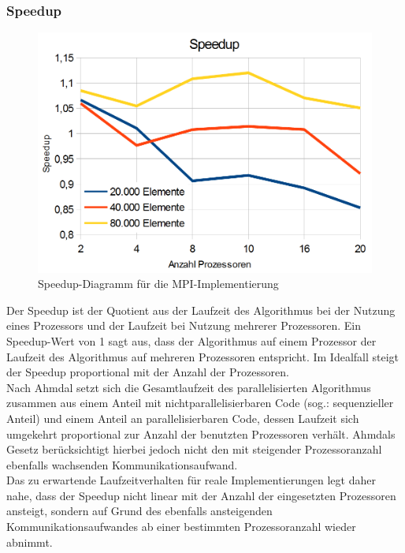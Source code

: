 \documentclass[a4paper,12pt]{scrartcl}
\begin{document}
\subsubsection{Speedup}
\begin{figure}[htb]
  \begin{center}
    \includegraphics[width=1\hsize]{../speedup.png}
  \end{center}
  \caption{\label{mpispeedup}
    Speedup-Diagramm f\"ur die MPI-Implementierung}
\end{figure}
Der Speedup ist der Quotient aus der Laufzeit des Algorithmus bei der Nutzung eines Prozessors und der Laufzeit bei Nutzung mehrerer Prozessoren.
Ein Speedup-Wert von 1 sagt aus, dass der Algorithmus auf einem Prozessor der Laufzeit des Algorithmus auf mehreren Prozessoren entspricht.
Im Idealfall steigt der Speedup proportional mit der Anzahl der Prozessoren. \\

Nach Ahmdal setzt sich die Gesamtlaufzeit des parallelisierten Algorithmus zusammen aus einem Anteil mit nichtparallelisierbaren Code (sog.: sequenzieller
Anteil) und einem Anteil an parallelisierbaren Code, dessen Laufzeit sich umgekehrt proportional zur Anzahl der benutzten Prozessoren verhält.
Ahmdals Gesetz berücksichtigt hierbei jedoch nicht den mit steigender Prozessoranzahl ebenfalls wachsenden Kommunikationsaufwand. \\

Das zu erwartende Laufzeitverhalten für reale Implementierungen legt daher nahe, dass der Speedup nicht linear mit der Anzahl der eingesetzten Prozessoren
ansteigt, sondern auf Grund des ebenfalls ansteigenden Kommunikationsaufwandes ab einer bestimmten Prozessoranzahl wieder abnimmt. \\
\end{document}
